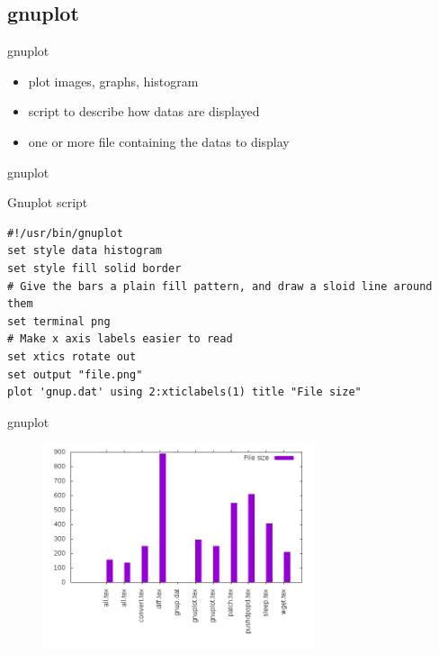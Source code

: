 \subsection{gnuplot}

\begin{frame}[fragile]{gnuplot}
  \begin{itemize}
    \pause \item plot images, graphs, histogram
    \pause \item script to describe how datas are displayed
    \pause \item one or more file containing the datas to display
  \end{itemize}
\end{frame}

\begin{frame}[fragile]{gnuplot}
  \begin{exampleblock}{Gnuplot script}
    \begin{lstlisting}[showstringspaces=false,basicstyle=\tiny]
#!/usr/bin/gnuplot
set style data histogram
set style fill solid border
# Give the bars a plain fill pattern, and draw a sloid line around them
set terminal png
# Make x axis labels easier to read
set xtics rotate out
set output "file.png"
plot 'gnup.dat' using 2:xticlabels(1) title "File size"
    \end{lstlisting}
  \end{exampleblock}
\end{frame}

\begin{frame}[fragile]{gnuplot}
  \begin{figure}[!h]
    \includegraphics[height=6cm]{img/gnup.png}
  \end{figure}
\end{frame}
